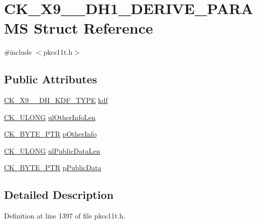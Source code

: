 \hypertarget{struct_c_k___x9__42___d_h1___d_e_r_i_v_e___p_a_r_a_m_s}{}\section{C\+K\+\_\+\+X9\+\_\+\_\+\+D\+H1\+\_\+\+D\+E\+R\+I\+V\+E\+\_\+\+P\+A\+R\+A\+MS Struct Reference}
\label{struct_c_k___x9__42___d_h1___d_e_r_i_v_e___p_a_r_a_m_s}


{\ttfamily \#include $<$pkcs11t.\+h$>$}

\subsection*{Public Attributes}
\begin{DoxyCompactItemize}
\item 
\hyperlink{pkcs11t_8h_a24f6d64f6b795fc778901d99e4126bde}{C\+K\+\_\+\+X9\+\_\+\_\+\+D\+H\+\_\+\+K\+D\+F\+\_\+\+T\+Y\+PE} \hyperlink{struct_c_k___x9__42___d_h1___d_e_r_i_v_e___p_a_r_a_m_s_ac146ca5909e4014a93a594a28e1ed1aa}{kdf}
\item 
\hyperlink{pkcs11t_8h_a35181858a3b7a0a81f49d180d8f446ef}{C\+K\+\_\+\+U\+L\+O\+NG} \hyperlink{struct_c_k___x9__42___d_h1___d_e_r_i_v_e___p_a_r_a_m_s_ae1fbe145c010d0da95b6dcbbbbde66b2}{ul\+Other\+Info\+Len}
\item 
\hyperlink{pkcs11t_8h_a3d7233a4077fbaf7ae76b64da0a62a21}{C\+K\+\_\+\+B\+Y\+T\+E\+\_\+\+P\+TR} \hyperlink{struct_c_k___x9__42___d_h1___d_e_r_i_v_e___p_a_r_a_m_s_a04a9225bf31fab76357710bd5db02867}{p\+Other\+Info}
\item 
\hyperlink{pkcs11t_8h_a35181858a3b7a0a81f49d180d8f446ef}{C\+K\+\_\+\+U\+L\+O\+NG} \hyperlink{struct_c_k___x9__42___d_h1___d_e_r_i_v_e___p_a_r_a_m_s_a018761bbb49073be69643c0611a18a0b}{ul\+Public\+Data\+Len}
\item 
\hyperlink{pkcs11t_8h_a3d7233a4077fbaf7ae76b64da0a62a21}{C\+K\+\_\+\+B\+Y\+T\+E\+\_\+\+P\+TR} \hyperlink{struct_c_k___x9__42___d_h1___d_e_r_i_v_e___p_a_r_a_m_s_afbd09648c23c237f640bbef4d9151161}{p\+Public\+Data}
\end{DoxyCompactItemize}


\subsection{Detailed Description}


Definition at line 1397 of file pkcs11t.\+h.




